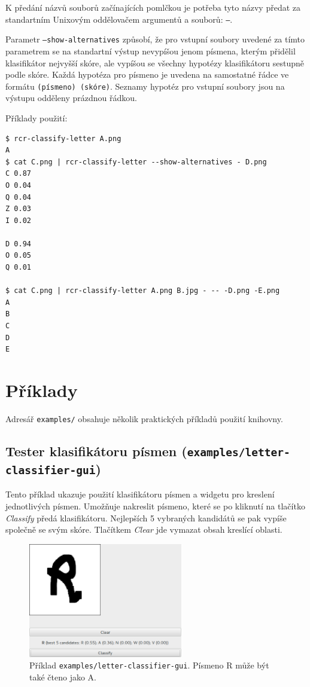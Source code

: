 \documentclass[a4paper]{article}
\begin{document}
K předání názvů souborů začínajících pomlčkou je potřeba tyto názvy předat
za standartním Unixovým oddělovačem argumentů a souborů: \texttt{--}.

Parametr \texttt{--show-alternatives} způsobí, že pro vstupní soubory
uvedené za tímto parametrem se na standartní výstup nevypíšou jenom
písmena, kterým přidělil klasifikátor nejvyšší skóre, ale vypíšou se
všechny hypotézy klasifikátoru sestupně podle skóre. Každá hypotéza
pro písmeno je uvedena na samostatné řádce ve formátu \texttt{(písmeno)
(skóre)}. Seznamy hypotéz pro vstupní soubory jsou na výstupu odděleny prázdnou
řádkou.

Příklady použití:
\begin{lstlisting}
$ rcr-classify-letter A.png
A
$ cat C.png | rcr-classify-letter --show-alternatives - D.png
C 0.87
O 0.04
Q 0.04
Z 0.03
I 0.02

D 0.94
O 0.05
Q 0.01

$ cat C.png | rcr-classify-letter A.png B.jpg - -- -D.png -E.png
A
B
C
D
E
\end{lstlisting}

\section{Příklady}
Adresář \texttt{examples/} obsahuje několik praktických příkladů použití knihovny.

\subsection{Tester klasifikátoru písmen (\texttt{examples/letter-classifier-gui})}
Tento příklad ukazuje použití klasifikátoru písmen a widgetu pro kreslení
jednotlivých písmen. Umožňuje nakreslit písmeno, které se po kliknutí na
tlačítko \textit{Classify} předá klasifikátoru. Nejlepších 5 vybraných kandidátů
se pak vypíše společně se svým skóre. Tlačítkem \textit{Clear} jde vymazat obsah
kreslící oblasti.

\begin{figure}[h]
\centering
\includegraphics[width=0.6\textwidth]{letter_classifier_gui}
\caption{Příklad \texttt{examples/letter-classifier-gui}. Písmeno R může být také čteno jako A.}
\end{figure}
\end{document}
